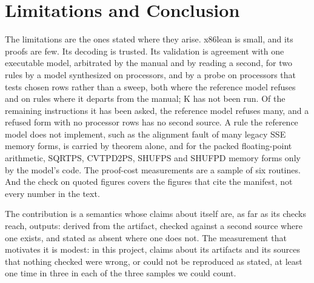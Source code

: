 \documentclass[runningheads]{llncs}
\begin{document}
\section{Limitations and Conclusion}
\label{sec:conclusion}

The limitations are the ones stated where they arise. x86lean is small, and its proofs are few. Its
decoding is trusted. Its validation is agreement with one executable model, arbitrated by the manual and
by reading a second, for two rules by a model synthesized on processors, and by a probe on processors that tests chosen rows rather than a sweep, both where the reference model refuses and on rules where it departs from the manual; K has not been run. Of the
remaining instructions it has been asked, the reference model refuses many, and a refused
form with no processor rows has no second source. A rule the reference model does not implement, such as the alignment fault of many legacy SSE memory
forms, is carried by theorem alone, and for the packed floating-point arithmetic, SQRTPS, CVTPD2PS, SHUFPS
and SHUFPD memory forms only by the model's code. The proof-cost measurements are a sample of six routines. And the
check on quoted figures covers the figures that cite the manifest, not every number in the text.

The contribution is a semantics whose claims about itself are, as far as its checks reach, outputs: derived from the artifact, checked against a second source where one exists, and
stated as absent where one does not. The measurement that motivates it is modest: in this
project, claims about its artifacts and its sources that nothing checked were wrong, or could not be
reproduced as stated, at least one time in three in each of the three samples we could count.

\end{document}
